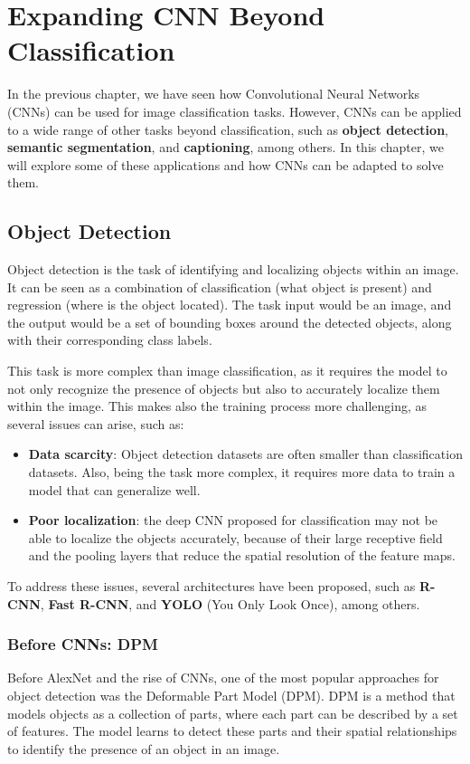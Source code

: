 \section{Expanding CNN Beyond Classification}
In the previous chapter, we have seen how Convolutional Neural Networks (CNNs) can be used for image classification tasks. 
However, CNNs can be applied to a wide range of other tasks beyond classification, such as \textbf{object detection}, 
\textbf{semantic segmentation}, and \textbf{captioning}, among others.
In this chapter, we will explore some of these applications and how CNNs can be adapted to solve them.

\subsection{Object Detection}
Object detection is the task of identifying and localizing objects within an image. It can be seen as a combination of
classification (what object is present) and regression (where is the object located).
The task input would be an image, and the output would be a set of bounding boxes around the detected objects, along with their corresponding class labels.

This task is more complex than image classification, as it requires the model to not only recognize the presence of objects but also to accurately localize them within the image.
This makes also the training process more challenging, as several issues can arise, such as:
\begin{itemize}
    \item \textbf{Data scarcity}: Object detection datasets are often smaller than classification datasets. Also,
    being the task more complex, it requires more data to train a model that can generalize well.
    \item \textbf{Poor localization}: the deep CNN proposed for classification may not be able to localize the objects accurately, 
    because of their large receptive field and the pooling layers that reduce the spatial resolution of the feature maps.
\end{itemize}

To address these issues, several architectures have been proposed, such as \textbf{R-CNN}, \textbf{Fast R-CNN}, and \textbf{YOLO} (You Only Look Once), among others.

\subsubsection{Before CNNs: DPM}
Before AlexNet and the rise of CNNs, one of the most popular approaches for object detection was the Deformable Part Model (DPM).
DPM is a method that models objects as a collection of parts, where each part can be described by a set of features. 
The model learns to detect these parts and their spatial relationships to identify the presence of an object in an image.


